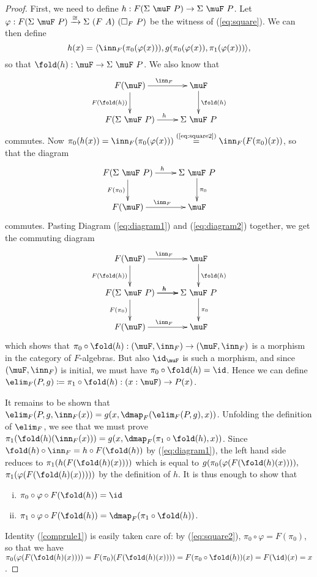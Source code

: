 \documentclass{article}
\begin{document}
\begin{proof}
First, we need to define $h : F(\Sigma\ \muF\ P) \to \Sigma\ \muF\
P$. Let $\varphi : F (\Sigma\ \muF\ P) \xrightarrow{\cong} \Sigma\ (F\
A)\ (\square_F\ P)$ be the witness of (\ref{eq:square}). We can then
define
\[
h(x) = \langle \inn_F(\pi_0(\varphi(x))), g(\pi_0(\varphi(x)),\pi_1(\varphi(x)))\rangle,
\]
so that $\fold(h) : \muF \to \Sigma\ \muF\ P$. We also know that
\begin{equation}
\label{eq:diagram1}
\xymatrix
{
F(\muF) \ar^{\inn_F}[r] \ar_{F(\fold(h))}[d] & \muF \ar^{\fold(h)}[d]\\
F(\Sigma\ \muF\ P) \ar^{h}[r] & \Sigma\ \muF\ P
}
\end{equation}
commutes. Now $\pi_0(h(x)) = \inn_F(\pi_0(\varphi(x)))
\stackrel{(\text{\ref{eq:square2}})}{=} \inn_F(F(\pi_0)(x))$, so that
the diagram
\begin{equation}
\label{eq:diagram2}
\xymatrix
{
F(\Sigma\ \muF\ P) \ar^{h}[r] \ar_{F(\pi_0)}[d] & \Sigma\ \muF\ P \ar^{\pi_0}[d] \\
F(\muF) \ar^{\inn_F}[r] & \muF 
}
\end{equation}
commutes. Pasting Diagram (\ref{eq:diagram1}) and (\ref{eq:diagram2}) together, we get the commuting diagram
\[
\xymatrix
{
F(\muF) \ar^{\inn_F}[r] \ar_{F(\fold(h))}[d] & \muF \ar^{\fold(h)}[d]\\
F(\Sigma\ \muF\ P) \ar^{h}[r] \ar^{h}[r] \ar_{F(\pi_0)}[d] & \Sigma\ \muF\ P \ar^{\pi_0}[d] \\
F(\muF) \ar^{\inn_F}[r] & \muF 
}
\]
which shows that $\pi_0 \circ \fold(h) : (\muF, \inn_F) \to (\muF,
\inn_F)$ is a morphism in the category of $F$-algebras. But also
$\id_{\muF}$ is such a morphism, and since $ (\muF, \inn_F)$ is
initial, we must have $\pi_0 \circ \fold(h) = \id$. Hence we can
define $\elim_F(P, g) \coloneqq \pi_1 \circ \fold(h) : (x : \muF) \to
P(x)$.

It remains to be shown that $\elim_F(P, g, \inn_F(x)) = g(x,
\dmap_F(\elim_F(P, g), x))$. Unfolding the definition of $\elim_F$, we
see that we must prove $\pi_1(\fold(h)(\inn_F(x))) = g(x,
\dmap_F(\pi_1\circ\fold(h), x))$. Since $\fold(h) \circ \inn_F = h
\circ F(\fold(h))$ by (\ref{eq:diagram1}), the left hand side reduces
to $\pi_1(h(F(\fold(h)(x))))$ which is equal to
$g(\pi_0(\varphi(F(\fold(h)(x)))),$ $\pi_1(\varphi(F(\fold(h)(x)))))$
by the definition of $h$. It is thus enough to show that
\begin{enumerate}[(i)]
\item $\pi_0 \circ \varphi \circ F(\fold(h)) = \id$ \label{comprule1}
\item $\pi_1 \circ \varphi \circ F(\fold(h)) = \dmap_F(\pi_1\circ\fold(h))$. \label{comprule2}
\end{enumerate}
Identity (\ref{comprule1}) is easily taken care of: by
(\ref{eq:square2}), $\pi_0 \circ \varphi = F(\pi_0)$, so that we have
$\pi_0(\varphi(F(\fold(h)(x)))) = F(\pi_0)(F(\fold(h)(x)))) = F(\pi_0
\circ \fold(h))(x) = F(\id)(x) = x$.


\end{proof}
\end{document}
